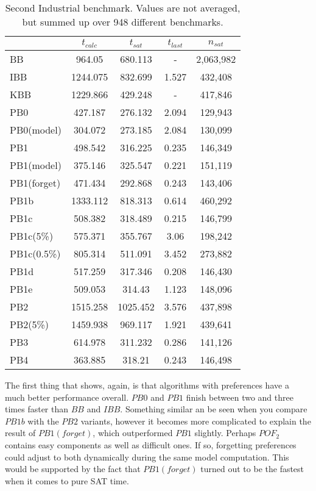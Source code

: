 \begin{wraptable}{R}{8cm}
\begin{tabular}{l| c c c c}
& $t_{calc}$ & $t_{sat}$ & $t_{last}$ & $n_{sat}$ \\
 \hline
BB & 964.05 & 680.113 & - & 2,063,982\\
IBB & 1244.075 & 832.699 & 1.527 & 432,408\\
KBB & 1229.866 & 429.248 & - & 417,846\\
PB0 & 427.187 & 276.132 & 2.094 & 129,943\\
PB0(model) & 304.072 & 273.185 & 2.084 & 130,099\\
PB1 & 498.542 & 316.225 & 0.235 & 146,349\\
PB1(model) & 375.146 & 325.547 & 0.221 & 151,119\\
PB1(forget) & 471.434 & 292.868 & 0.243 & 143,406\\
PB1b & 1333.112 & 818.313 & 0.614 & 460,292\\
PB1c & 508.382 & 318.489 & 0.215 & 146,799\\
PB1c(5\%) & 575.371 & 355.767 & 3.06 & 198,242\\
PB1c(0.5\%) & 805.314 & 511.091 & 3.452 & 273,882\\
PB1d & 517.259 & 317.346 & 0.208 & 146,430\\
PB1e & 509.053 & 314.43 & 1.123 & 148,096\\
PB2 & 1515.258 & 1025.452 & 3.576 & 437,898\\
PB2(5\%) & 1459.938 & 969.117 & 1.921 & 439,641\\
PB3 & 614.978 & 311.232 & 0.286 & 141,126\\
PB4 & 363.885 & 318.21 & 0.243 & 146,498\\
\end{tabular}
\caption{Second Industrial benchmark. Values are not averaged, but summed up over 948 different benchmarks.}
\label{tab:vonThore2pof} %
\end{wraptable}

The first thing that shows, again, is that algorithms with preferences have a much better performance overall. $PB0$ and $PB1$ finish between two and three times faster than $BB$ and $IBB$. Something similar an be seen when you compare $PB1b$ with the $PB2$ variants, however it becomes more complicated to explain the result of $PB1(forget)$, which outperformed $PB1$ slightly. Perhaps $POF_2$ contains easy components as well as difficult ones. If so, forgetting preferences could adjust to both dynamically during the same model computation. This would be supported by the fact that $PB1(forget)$ turned out to be the fastest when it comes to pure SAT time.

